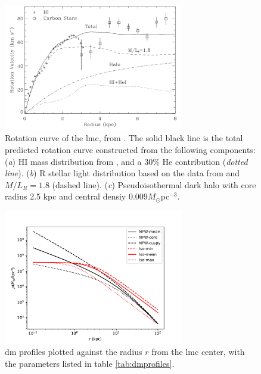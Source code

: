 \documentclass[main.tex]{subfiles}
\begin{document}
\begin{figure}[h]
  \centering
  \includegraphics[width=0.7\textwidth]{Pictures/rotationcurvelmc.pdf}
  \caption{\label{fig:rotcurve} Rotation curve of the \gls{lmc}, from \cite{LMCHI}. The solid black line is the total predicted rotation curve constructed from the following components: (\textit{a}) HI mass distribution from \cite{1992gasLMC}, and a 30\% He contribution (\textit{dotted line}). (\textit{b}) R stellar light distribution based on the data from \cite{1958starsinLMC} and $M/L_{R}=1.8$ (dashed line). (\textit{c}) Pseudoisothermal dark halo with core radius 2.5 kpc and central densiy $0.009 M_{\odot}$pc$^{-3}$.}
\end{figure}

\begin{figure}[h]
  \centering
  \includegraphics[width=0.7\textwidth]{Pictures/dmprofiles.pdf}
  \caption{\gls{dm} profiles plotted against the radius $r$ from the \gls{lmc} center, with the parameters listed in table \ref{tab:dmprofiles}.} \label{fig:dmprofiles}
\end{figure}
\end{document}
